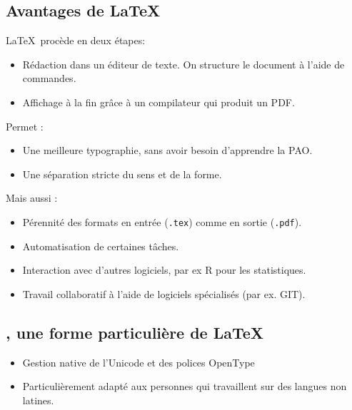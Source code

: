 \subsection{Avantages de \LaTeX}
\begin{frame}
\LaTeX\ procède en deux étapes:

\begin{itemize}
  \item Rédaction dans un éditeur de texte. On structure le document à l'aide de commandes.
  \item Affichage à la fin grâce à un compilateur qui produit un PDF.
\end{itemize}

\begin{frame}
  Permet :
  \begin{itemize}
    \item Une meilleure typographie, sans avoir besoin d'apprendre la PAO.
    \item Une séparation stricte du sens et de la forme.
  \end{itemize}
\end{frame}

\begin{frame}
  Mais aussi :
  \begin{itemize}
      \item Pérennité des formats en entrée (\verb+.tex+) comme en sortie (\verb+.pdf+).
      \item Automatisation de certaines tâches.
      \item Interaction avec d'autres logiciels, par ex R pour les statistiques.
      \item Travail collaboratif à l'aide de logiciels spécialisés (par ex. GIT).
  \end{itemize}
\end{frame}

\subsection{\XeLaTeX, une forme particulière de \LaTeX}
\begin{frame}
  \begin{itemize}
    \item Gestion native de l'Unicode et des polices OpenType
    \item Particulièrement adapté aux personnes qui travaillent sur des langues non latines.
  \end{itemize}
\end{frame}


\end{frame}
